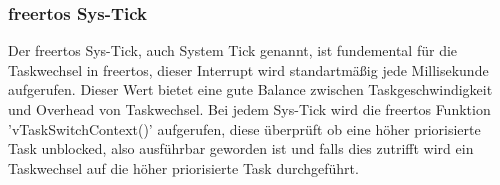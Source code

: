 \documentclass[../EDF Master Thesis.tex]{subfiles}
\begin{document}
\subsubsection{\ac{freertos} Sys-Tick}
Der \ac{freertos} Sys-Tick, auch System Tick genannt, ist fundemental für die Taskwechsel in \ac{freertos}, dieser Interrupt wird standartmäßig jede Millisekunde aufgerufen.
Dieser Wert bietet eine gute Balance zwischen Taskgeschwindigkeit und Overhead von Taskwechsel.
Bei jedem Sys-Tick wird die \ac{freertos} Funktion 'vTaskSwitchContext()' aufgerufen, diese überprüft ob eine höher priorisierte Task unblocked, also ausführbar geworden ist und falls dies zutrifft wird ein Taskwechsel auf die höher priorisierte Task durchgeführt.
\end{document}
